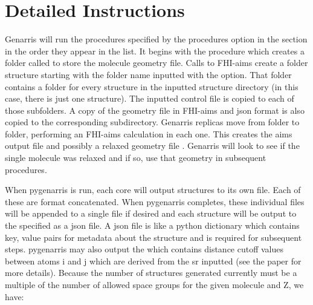 \documentclass[letterpaper,10pt,english]{sphinxmanual}
\begin{document}
\section{Detailed Instructions}
\label{\detokenize{index:detailed-instructions}}\label{\detokenize{index:id1}}
Genarris will run the procedures specified by the procedures option in the
 section in the order they appear in the list.
It begins with the  procedure which creates a folder
called  to store the
molecule geometry file. Calls to FHI-aims create a folder structure starting
with the folder name inputted with the  option.
That folder contains a folder for every structure in the inputted structure
directory (in this case, there is just one structure). The
inputted control file is copied to each of those subfolders. A copy of the
geometry file in FHI-aims and json format is also copied to the
corresponding subdirectory. Genarris replicas move from folder to folder,
performing an FHI-aims calculation in each one. This creates
the aims output file  and possibly a relaxed geometry file
. Genarris will look to see if the single molecule
was relaxed and if so, use that geometry in subsequent procedures.

When pygenarris is run, each core will output structures to its own
 file. Each of these are  format concatenated.
When pygenarris completes, these individual files will be appended to a
single  file if desired and each structure will be
output to the  specified as a json file. A json file is like a
python dictionary which contains key, value pairs for metadata
about the structure and is required for subsequent steps. pygenarris may also
output the  which contains distance cutoff
values between atoms i and j which are derived from the sr inputted
(see the paper for more details). Because the number of structures generated
currently must be a multiple of the number of allowed space groups for the
given molecule and Z, we have:

\begin{sphinxVerbatim}[commandchars=\\\{\}]
 
                 
                  
\end{sphinxVerbatim}
\end{document}
